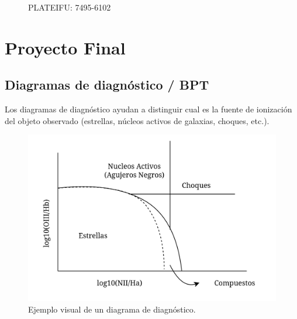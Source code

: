 \documentclass[10pt,twocolumn,a4paper]{opticajnl}
\begin{document}
\begin{figure}
    \caption{PLATEIFU: 7495-6102}
    \label{fig:moreinfo}
\end{figure}

\newpage


\section*{Proyecto Final}

\subsection*{Diagramas de diagnóstico / BPT}
Los diagramas de diagnóstico ayudan a distinguir cual es la fuente de ionización del objeto observado (estrellas, núcleos activos de galaxias, choques, etc.).

\begin{figure}
  \begin{center}
    \includegraphics[width=1\linewidth]{./diagrama_ejemplo.png}
  \end{center}
  \caption{Ejemplo visual de un diagrama de diagnóstico.}
  \label{fig:diagrama_profe}
\end{figure}
\end{document}
